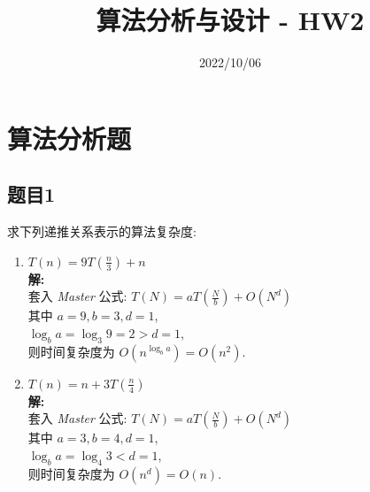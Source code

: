 \documentclass[a4paper]{ctexart}
\title{算法分析与设计 - HW2}
\author{}
\date{2022/10/06}
\begin{document}
\begin{sloppypar}

    \maketitle

    \section*{算法分析题}

    \subsection*{题目1}
    求下列递推关系表示的算法复杂度:
    \begin{enumerate}[(1)]
        \item $T(n) = 9T(\frac{n}{3}) + n$ \\
              \textbf{解:} \\
              套入 \emph{Master} 公式: $T(N) = aT(\frac{N}{b}) + O(N^d)$ \\
              其中 $a = 9, b = 3, d = 1$, \\
              $\log_b a = \log_3 9 = 2 > d = 1$, \\
              则时间复杂度为 $O(n^{\log_b a}) = O(n^2)$.

        \item $T(n) = n + 3T(\frac{n}{4})$ \\
              \textbf{解:} \\
              套入 \emph{Master} 公式: $T(N) = aT(\frac{N}{b}) + O(N^d)$ \\
              其中 $a = 3, b = 4, d = 1$, \\
              $\log_b a = \log_4 3 < d = 1$, \\
              则时间复杂度为 $O(n^d) = O(n)$.


\end{enumerate}
\end{sloppypar}
\end{document}
